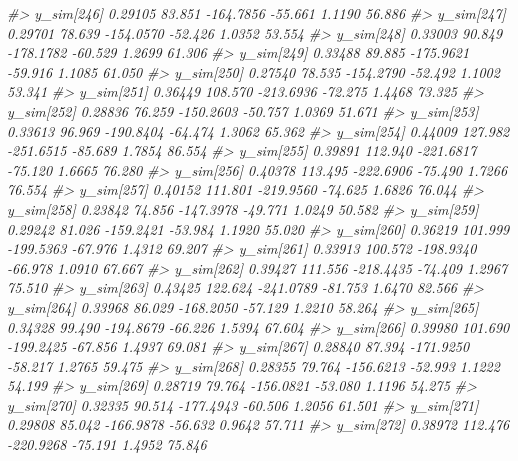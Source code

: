 \documentclass[
  10pt,
  italian,
  a4paper,
  extrafontsizes,onecolumn,openright
  ]{memoir}
\newenvironment{Shaded}{\begin{snugshade}}{\end{snugshade}}
\newcommand{\CommentTok}[1]{\textcolor[rgb]{0.56,0.35,0.01}{\textit{#1}}}
\begin{document}
\begin{Shaded}
\begin{Highlighting}[]
\CommentTok{\#\textgreater{}   y\_sim[246]  0.29105  83.851 {-}164.7856 {-}55.661  1.1190 56.886}
\CommentTok{\#\textgreater{}   y\_sim[247]  0.29701  78.639 {-}154.0570 {-}52.426  1.0352 53.554}
\CommentTok{\#\textgreater{}   y\_sim[248]  0.33003  90.849 {-}178.1782 {-}60.529  1.2699 61.306}
\CommentTok{\#\textgreater{}   y\_sim[249]  0.33488  89.885 {-}175.9621 {-}59.916  1.1085 61.050}
\CommentTok{\#\textgreater{}   y\_sim[250]  0.27540  78.535 {-}154.2790 {-}52.492  1.1002 53.341}
\CommentTok{\#\textgreater{}   y\_sim[251]  0.36449 108.570 {-}213.6936 {-}72.275  1.4468 73.325}
\CommentTok{\#\textgreater{}   y\_sim[252]  0.28836  76.259 {-}150.2603 {-}50.757  1.0369 51.671}
\CommentTok{\#\textgreater{}   y\_sim[253]  0.33613  96.969 {-}190.8404 {-}64.474  1.3062 65.362}
\CommentTok{\#\textgreater{}   y\_sim[254]  0.44009 127.982 {-}251.6515 {-}85.689  1.7854 86.554}
\CommentTok{\#\textgreater{}   y\_sim[255]  0.39891 112.940 {-}221.6817 {-}75.120  1.6665 76.280}
\CommentTok{\#\textgreater{}   y\_sim[256]  0.40378 113.495 {-}222.6906 {-}75.490  1.7266 76.554}
\CommentTok{\#\textgreater{}   y\_sim[257]  0.40152 111.801 {-}219.9560 {-}74.625  1.6826 76.044}
\CommentTok{\#\textgreater{}   y\_sim[258]  0.23842  74.856 {-}147.3978 {-}49.771  1.0249 50.582}
\CommentTok{\#\textgreater{}   y\_sim[259]  0.29242  81.026 {-}159.2421 {-}53.984  1.1920 55.020}
\CommentTok{\#\textgreater{}   y\_sim[260]  0.36219 101.999 {-}199.5363 {-}67.976  1.4312 69.207}
\CommentTok{\#\textgreater{}   y\_sim[261]  0.33913 100.572 {-}198.9340 {-}66.978  1.0910 67.667}
\CommentTok{\#\textgreater{}   y\_sim[262]  0.39427 111.556 {-}218.4435 {-}74.409  1.2967 75.510}
\CommentTok{\#\textgreater{}   y\_sim[263]  0.43425 122.624 {-}241.0789 {-}81.753  1.6470 82.566}
\CommentTok{\#\textgreater{}   y\_sim[264]  0.33968  86.029 {-}168.2050 {-}57.129  1.2210 58.264}
\CommentTok{\#\textgreater{}   y\_sim[265]  0.34328  99.490 {-}194.8679 {-}66.226  1.5394 67.604}
\CommentTok{\#\textgreater{}   y\_sim[266]  0.39980 101.690 {-}199.2425 {-}67.856  1.4937 69.081}
\CommentTok{\#\textgreater{}   y\_sim[267]  0.28840  87.394 {-}171.9250 {-}58.217  1.2765 59.475}
\CommentTok{\#\textgreater{}   y\_sim[268]  0.28355  79.764 {-}156.6213 {-}52.993  1.1222 54.199}
\CommentTok{\#\textgreater{}   y\_sim[269]  0.28719  79.764 {-}156.0821 {-}53.080  1.1196 54.275}
\CommentTok{\#\textgreater{}   y\_sim[270]  0.32335  90.514 {-}177.4943 {-}60.506  1.2056 61.501}
\CommentTok{\#\textgreater{}   y\_sim[271]  0.29808  85.042 {-}166.9878 {-}56.632  0.9642 57.711}
\CommentTok{\#\textgreater{}   y\_sim[272]  0.38972 112.476 {-}220.9268 {-}75.191  1.4952 75.846}

\end{Highlighting}
\end{Shaded}
\end{document}
